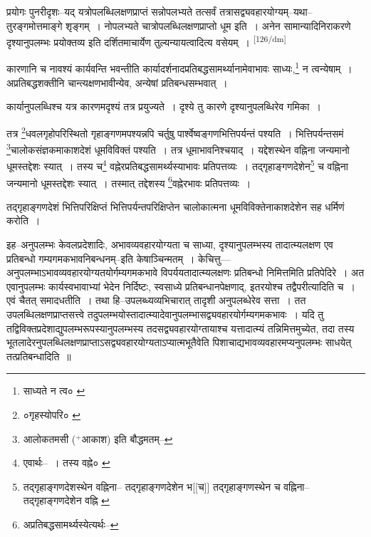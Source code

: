 \documentclass[article,12pt,a4paper]{memoir}
\newcommand{\add}[1]{($^{+}$#1)}
\begin{document}
	  \pstart प्रयोगः पुनरीदृशः--यद् यत्रोपलब्धिलक्षणप्राप्तं सन्नोपलभ्यते तत्सर्वं तत्रासद्व्यवहारयोग्यम्--यथा--तुरङ्गमोत्तमाङ्गे शृङ्गम् । नोपलभ्यते चात्रोपलब्धिलक्षणप्राप्तो धूम इति । अनेन सामान्यादिनिराकरणे दृश्यानुपलम्भः प्रयोक्तव्य इति दर्शितमाचार्येण तुल्यन्यायत्वादित्य वसेयम् ।
	\pend
      \leavevmode\textsuperscript{\rmlatinfont\tiny [126/dm]}

	  \pstart कारणानि च नावश्यं कार्यवन्ति भवन्तीति कार्यादर्शनादप्रतिबद्धसामर्थ्यानामेवाभावः साध्यः,\footnote{साध्यते न त्व० \cite{dp-msC}} न त्वन्येषाम् । अप्रतिबद्धशक्तीनि चान्त्यक्षणभावीन्येव, अन्येषां प्रतिबन्धसम्भवात् ।
	\pend
       

	  \pstart कार्यानुपलब्धिश्च यत्र कारणमदृश्यं तत्र प्रयुज्यते । दृश्ये तु कारणे दृश्यानुपलब्धिरेव गमिका ।
	\pend
       

	  \pstart तत्र \footnote{०गृहस्योपरि० \cite{dp-msB} \cite{dp-msC} \cite{dp-msD}}धवलगृहोपरिस्थितो गृहाङ्गणमपश्यन्नपि चर्तुषु पार्श्वेष्वङ्गणभित्तिपर्यन्तं पश्यति । भित्तिपर्यन्तसमं \footnote{आलोकतमसी \add{आकाश} इति बौद्धमतम्--\cite{dp-msD-n}}चालोकसंज्ञकमाकाशदेशं धूमविविक्तं पश्यति । तत्र धूमाभावनिश्चयाद् । यद्देशस्थेन वह्निना जन्यमानो धूमस्तद्देशः स्यात् । तस्य च\footnote{एवार्थः--\cite{dp-msD-n} । तस्य वह्ने० \cite{dp-msB}} वह्नेरप्रतिबद्धसामर्थ्यस्याभावः प्रतिपत्तव्यः । तद्गृहाङ्गणदेशेन\footnote{तद्गृहाङ्गणदेशस्थेन वह्निना--\cite{dp-msC} \cite{dp-msD} तद्गृहाङ्गणदेशेन भ[[च]] \cite{dp-msA} तद्गृहाङ्गणस्थेन च वह्निना--\cite{dp-msB} तद्गृहाङ्गणदेशेन वह्नि \cite{dp-edP} \cite{dp-edH} \cite{dp-edE}} च वह्निना जन्यमानो धूमस्तद्देशः स्यात् । तस्मात् तद्देशस्य \footnote{अप्रतिबद्धसामर्थ्यस्येत्यर्थः--\cite{dp-msD-n}}वह्नेरभावः प्रतिपत्तव्यः ।
	\pend
       

	  \pstart तद्गृहाङ्गणदेशं भित्तिपरिक्षिप्तं भित्तिपर्यन्तपरिक्षिप्तेन चालोकात्मना धूमविविक्तेनाकाशदेशेन सह धर्मिणं करोति ।
	\pend
      

	  \pstart इह--अनुपलम्भः केवलप्रदेशादिः, अभावव्यवहारयोग्यता च साध्या, दृश्यानुपलम्भस्य तादात्म्यलक्षण एव प्रतिबन्धो गम्यगमकभावनिबन्धनम्--इति केषाञ्चिन्मतम् । केचित्तु—अनुपलम्भाऽभावव्यवहारयोग्यतयोर्गम्यगमकभावे विपर्ययतादात्म्यलक्षणः प्रतिबन्धो निमित्तमिति प्रतिपेदिरे । अत एवानुपलम्भः कार्यस्वभावाभ्यां भेदेन निर्दिष्टः, स्वसाध्ये प्रतिबन्धानपेक्षणाद्, इतरयोश्च तद्वैपरीत्यादिति च । एवं चैतत् समादधतीति । तथा हि--उपलब्ध्यव्यभिचारात् तादृशी अनुपलब्धेरेव सत्ता । तत उपलब्धिलक्षणप्राप्तसत्त्वे तदुपलम्भयोस्तादात्म्यादेवानुपलम्भासद्व्यवहारयोर्गम्यगमकभावः । यदि तु तद्विविक्तप्रदेशाद्युपलम्भरूपस्यानुपलम्भस्य तदसद्व्यवहारयोग्तायाश्च यत्तादात्म्यं तन्निमित्तमुच्येत, तदा तस्य भूतलादेरनुपलब्धिलक्षणप्राप्ताऽसद्व्यवहारयोग्यताऽप्यात्मभूतैवेति पिशाचाद्यभावव्यवहारमप्यनुपलम्भः साधयेत् तत्प्रतिबन्धादिति ॥
	\pend
      
\end{document}

